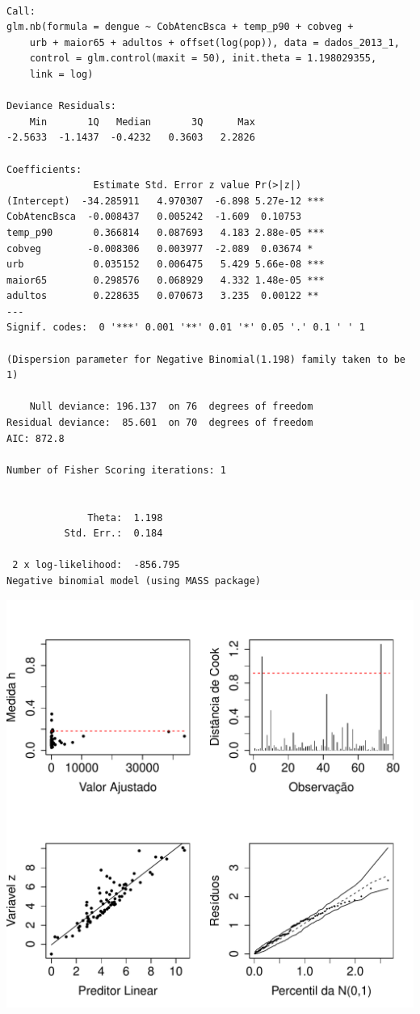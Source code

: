\documentclass[12pt,a4paper]{article}\usepackage[]{graphicx}\usepackage[]{color}
\makeatletter
\def\maxwidth{ %
  \ifdim\Gin@nat@width>\linewidth
    \linewidth
  \else
    \Gin@nat@width
  \fi
}
\newenvironment{kframe}{%
 \def\at@end@of@kframe{}%
 \ifinner\ifhmode%
  \def\at@end@of@kframe{\end{minipage}}%
  \begin{minipage}{\columnwidth}%
 \fi\fi%
 \def\FrameCommand##1{\hskip\@totalleftmargin \hskip-\fboxsep
 \colorbox{shadecolor}{##1}\hskip-\fboxsep
     \hskip-\linewidth \hskip-\@totalleftmargin \hskip\columnwidth}%
 \MakeFramed {\advance\hsize-\width
   \@totalleftmargin\z@ \linewidth\hsize
   \@setminipage}}%
 {\par\unskip\endMakeFramed%
 \at@end@of@kframe}
\newenvironment{knitrout}{}{} %
\makeatother
\begin{document}
\begin{knitrout}
\color{fgcolor}\begin{kframe}
\begin{verbatim}

Call:
glm.nb(formula = dengue ~ CobAtencBsca + temp_p90 + cobveg + 
    urb + maior65 + adultos + offset(log(pop)), data = dados_2013_1, 
    control = glm.control(maxit = 50), init.theta = 1.198029355, 
    link = log)

Deviance Residuals: 
    Min       1Q   Median       3Q      Max  
-2.5633  -1.1437  -0.4232   0.3603   2.2826  

Coefficients:
               Estimate Std. Error z value Pr(>|z|)    
(Intercept)  -34.285911   4.970307  -6.898 5.27e-12 ***
CobAtencBsca  -0.008437   0.005242  -1.609  0.10753    
temp_p90       0.366814   0.087693   4.183 2.88e-05 ***
cobveg        -0.008306   0.003977  -2.089  0.03674 *  
urb            0.035152   0.006475   5.429 5.66e-08 ***
maior65        0.298576   0.068929   4.332 1.48e-05 ***
adultos        0.228635   0.070673   3.235  0.00122 ** 
---
Signif. codes:  0 '***' 0.001 '**' 0.01 '*' 0.05 '.' 0.1 ' ' 1

(Dispersion parameter for Negative Binomial(1.198) family taken to be 1)

    Null deviance: 196.137  on 76  degrees of freedom
Residual deviance:  85.601  on 70  degrees of freedom
AIC: 872.8

Number of Fisher Scoring iterations: 1


              Theta:  1.198 
          Std. Err.:  0.184 

 2 x log-likelihood:  -856.795 
Negative binomial model (using MASS package) 
\end{verbatim}
\end{kframe}
\includegraphics[width=\maxwidth]{figure/unnamed-chunk-21-1} 

\end{knitrout}
\end{document}
